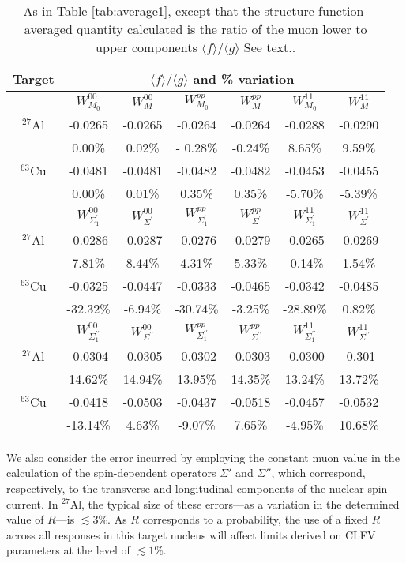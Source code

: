 \documentclass{book}[letterpaper,12pt]
\begin{document}
\begin{table}
\centering
 \begin{tabular}{ccccccc}
 \hline
 \hline
Target &  \multicolumn{5}{c}{~~~~~~~${\langle f \rangle/ \langle g \rangle}$ and \% variation}  &\\
\hline
  & $W_{M_0}^{00}$ & $W_M^{00}$ & $W_{M_0}^{pp}$ & $W_M^{pp}$ & $W_{M_0}^{11}$ & $W_M^{11}$ \\
 $^{27}$Al &-0.0265 &-0.0265 &-0.0264 &-0.0264 &-0.0288 & -0.0290 \\
  & 0.00\% & 0.02\% &- 0.28\% & -0.24\% & 8.65\% & 9.59\% \\
  $^{63}$Cu & -0.0481 & -0.0481 & -0.0482 & -0.0482 & -0.0453 & -0.0455 \\
  & 0.00\% & 0.01\% & 0.35\% & 0.35\% & -5.70\% & -5.39\% \\ [3mm]
 & $W_{\Sigma^\prime_1}^{00}$ & $W_{\Sigma^\prime}^{00}$ & $W_{\Sigma^\prime_1}^{pp}$ & $W_{\Sigma^\prime}^{pp}$ & $W_{\Sigma^\prime_1}^{11}$ & $W_{\Sigma^\prime}^{11}$ \\
 $^{27}$Al & -0.0286 & -0.0287 & -0.0276 & -0.0279 & -0.0265 & -0.0269  \\
  & 7.81\% & 8.44\% & 4.31\% & 5.33\% & -0.14\% & 1.54\% \\
  $^{63}$Cu & -0.0325 & -0.0447 & -0.0333 & -0.0465 & -0.0342 & -0.0485 \\
  & -32.32\% & -6.94\% & -30.74\% & -3.25\% & -28.89\% & 0.82\% \\ [3mm]
 & $W_{\Sigma^{\prime \prime}_1}^{00}$ & $W_{\Sigma^{\prime \prime}}^{00}$ & $W_{\Sigma^{\prime \prime}_1}^{pp}$ & $W_{\Sigma^{\prime \prime}}^{pp}$ & $W_{\Sigma^{\prime \prime}_1}^{11}$ & $W_{\Sigma^{\prime \prime}}^{11}$ \\
 $^{27}$Al & -0.0304 & -0.0305 & -0.0302 & -0.0303 &  -0.0300 &  -0.301 \\
  & 14.62\% & 14.94\% & 13.95\% & 14.35\% & 13.24\% & 13.72\% \\
  $^{63}$Cu & -0.0418 & -0.0503 & -0.0437 & -0.0518 & -0.0457 &  -0.0532 \\
  & -13.14\% & 4.63\% & -9.07\% & 7.65\% &  -4.95\% & 10.68\% \\ 
  \hline
  \hline
 \end{tabular}
  \caption{ \label{tab:average2} As in Table \ref{tab:average1}, except that the structure-function-averaged quantity calculated is the ratio of the muon lower to upper components $\langle f \rangle/\langle g \rangle$  See text..}
\end{table}
We also consider the error incurred by employing the constant muon value in the calculation of the spin-dependent operators $\Sigma'$ and $\Sigma''$, which correspond, respectively, to the transverse and longitudinal components of the nuclear spin current. In $^{27}$Al, the typical size of these errors---as a variation in the determined value of $R$---is $\lesssim 3$\%. As $R$ corresponds to a probability, the use of a fixed $R$ across all responses in this target nucleus will affect limits derived on CLFV parameters at the level of $\lesssim 1\%$. 
\end{document}

